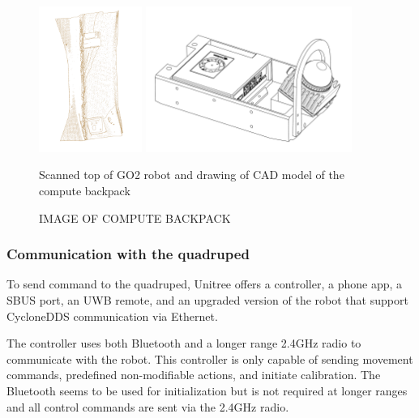 \documentclass[11pt]{article}
\begin{document}
        \begin{figure}[H]
            \centering
            \includegraphics[width=0.3\textwidth]{Images/ScanGO2Top.pdf}
            \includegraphics[width=0.6\textwidth]{Images/ComputeBackpack.pdf}
            \caption{Scanned top of GO2 robot and drawing of CAD model of the compute backpack }
            \label{fig:scanner_and_cad}
        \end{figure}




        \begin{figure}[H]
            \centering
            \color{red}
            IMAGE OF COMPUTE BACKPACK
        \end{figure}


        
        \subsubsection{Communication with the quadruped}

        To send command to the quadruped, Unitree offers a controller, a phone app, a SBUS port, an UWB remote, and an upgraded version of the robot that support CycloneDDS communication via Ethernet.

        The controller uses both Bluetooth and a longer range 2.4GHz radio to communicate with the robot. This controller is only capable of sending movement commands, predefined non-modifiable actions, and initiate calibration. The Bluetooth seems to be used for initialization but is not required at longer ranges and all control commands are sent via the 2.4GHz radio.
\end{document}
